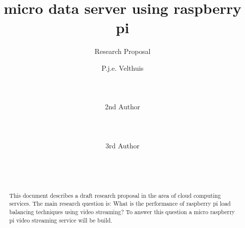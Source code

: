 \documentclass{sig-alternate-br}
\begin{document}
%

\title{micro data server using raspberry pi}
 \subtitle{Research Proposal}




\author{ 
%
%
\alignauthor P.j.e. Velthuis\\
       \\
       \\
       \\
\alignauthor 2nd Author\\
       \\
       \\
       \\
\alignauthor 3rd Author\\
       \\
       \\
       \\
}



\maketitle
\begin{abstract}
This document describes a draft research proposal in the
area of cloud computing services. The main research question
is: What is the performance of raspberry pi load balancing techniques using video streaming? To answer this question a micro raspberry pi video streaming service will be build. 
\end{abstract}
\end{document}
